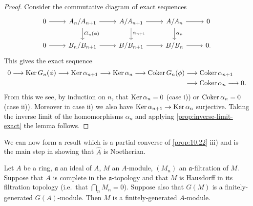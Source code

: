\begin{proof}
Consider the commutative diagram of exact sequences
\[
\begin{tikzcd}
0 \arrow[r] & A_n/A_{n+1} \arrow[r] \arrow[d, "G_n(\phi)"] & A/A_{n+1} \arrow[r] \arrow[d, "\alpha_{n+1}"] & A/A_n \arrow[r] \arrow[d, "\alpha_n"] & 0 \\
0 \arrow[r] & B_n/B_{n+1} \arrow[r] & B/B_{n+1} \arrow[r] & B/B_n \arrow[r] & 0.
\end{tikzcd}
\]
This gives the exact sequence
\begin{align*}
    0\longrightarrow \operatorname{Ker} G_n(\phi) \longrightarrow \operatorname{Ker} \alpha_{n+1} \longrightarrow \operatorname{Ker} \alpha_n \longrightarrow \operatorname{Coker} G_n(\phi) & \longrightarrow \operatorname{Coker} \alpha_{n+1} \\ & \longrightarrow \operatorname{Coker} \alpha_n \longrightarrow 0.
\end{align*}
From this we see, by induction on $n$, that $\operatorname{Ker} \alpha_n = 0$ (case i)) or $\operatorname{Coker} \alpha_n = 0$ (case ii)). Moreover in case ii) we also have $\operatorname{Ker} \alpha_{n+1} \to \operatorname{Ker} \alpha_n$ surjective. Taking the inverse limit of the homomorphisms $\alpha_n$ and applying \eqref{prop:inverse-limit-exact} the lemma follows.
\end{proof}

We can now form a result which is a partial converse of \eqref{prop:10.22} iii) and is the main step in showing that $\hat{A}$ is Noetherian.

\begin{proposition}\label{prop:10.24}
Let $A$ be a ring, $\mathfrak{a}$ an ideal of $A$, $M$ an $A$-module, $(M_n)$ an $\mathfrak{a}$-filtration of $M$. Suppose that $A$ is complete in the $\mathfrak{a}$-topology and that $M$ is Hausdorff in its filtration topology (i.e.\ that $\bigcap_n M_n = 0$). Suppose also that $G(M)$ is a finitely-generated $G(A)$-module. Then $M$ is a finitely-generated $A$-module.
\end{proposition}

